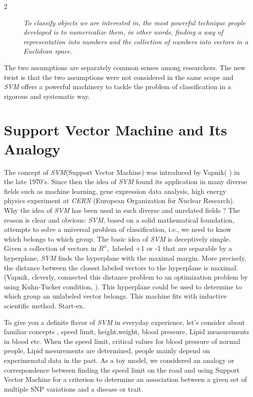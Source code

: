 \documentclass{amsart}%
\theoremstyle{plain}
\numberwithin{equation}{section}
\begin{document}
\begin{description}
\item[2]  \emph{To classify objects we are interested in, the most powerful
technique people developed is to numericalize them, in other words, finding
a way of representation into numbers and the collection of numbers into
vectors in a Euclidean space.}
\end{description}

The two assumptions are separately common senses among researchers. The new
twist is that the two assumptions were not considered in the same scope and 
\emph{SVM} offers a powerful machinery to tackle the problem of
classification in a rigorous and systematic way.

\section{Support Vector Machine and Its Analogy}

The concept of \emph{SVM}(Support Vector Machine) was introduced by Vapnik(%
\cite{Va}) in the late 1970's. Since then the idea of \emph{SVM} found its
application in many diverse fields such as machine learning, gene expression
data analysis, high energy physics experiment at \emph{CERN} (European
Organization for Nuclear Research). Why the idea of \emph{SVM} has
been used in such diverse and unrelated fields ? The reason is clear and obvious: \emph{%
SVM}, based on a solid mathematical foundation, attempts to solve a
universal problem of classification, i.e., we need to know which belongs to
which group. The basic idea of \emph{SVM} is deceptively simple. Given a
collection of vectors in $R^n,$ labeled +1 or -1 that are separable by a
hyperplane, \emph{SVM} finds the hyperplane with the maximal margin. More
precisely, the distance between the closest labeled vectors to the
hyperplane is maximal.(Vapnik, cleverly, connected this distance problem to
an optimization problem by using Kuhn-Tucker condition, \cite{Si}). This
hyperplane could be used to determine to which group an unlabeled vector belongs. This machine fits with inductive scientific method.   Start-ex. %







To give you a definite flavor of \emph{SVM} in everyday experience, let's
consider about familiar concepts , speed limit, height,weight, blood pressure,
Lipid measurements in blood etc. When the speed limit, critical
values for blood pressure of normal people, Lipid mesurements are
determined, people mainly depend on experimenatal data in the past. As a toy
model, we considered an analogy or correspondence between finding the speed
limit on the road and using Support Vector Machine for a criterion to
determine an association between a given set of multiple SNP variations and
a disease or trait.
\end{document}
